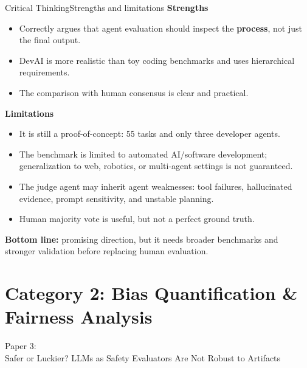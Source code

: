 \documentclass[10pt]{beamer}
\begin{document}
	\begin{frame}{Critical Thinking}{Strengths and limitations}
		\textbf{Strengths}
		\begin{itemize}
			\item Correctly argues that agent evaluation should inspect the \textbf{process}, not just the final output.
			\item DevAI is more realistic than toy coding benchmarks and uses hierarchical requirements.
			\item The comparison with human consensus is clear and practical.
		\end{itemize}
		\vspace{0.1cm}
		\textbf{Limitations}
		\begin{itemize}
			\item It is still a proof-of-concept: 55 tasks and only three developer agents.
			\item The benchmark is limited to automated AI/software development; generalization to web, robotics, or multi-agent settings is not guaranteed.
			\item The judge agent may inherit agent weaknesses: tool failures, hallucinated evidence, prompt sensitivity, and unstable planning.
			\item Human majority vote is useful, but not a perfect ground truth.
		\end{itemize}
		\vspace{0.1cm}
		\textbf{Bottom line:} promising direction, but it needs broader benchmarks and stronger validation before replacing human evaluation.
	\end{frame}
	
	
	
	\section{Category 2: Bias Quantification \& Fairness Analysis}

	\begin{frame}[standout]
		\hypertarget{paper3}{}
		\Large Paper 3:\\Safer or Luckier? LLMs as Safety Evaluators Are Not Robust to Artifacts
	\end{frame}

\end{document}
